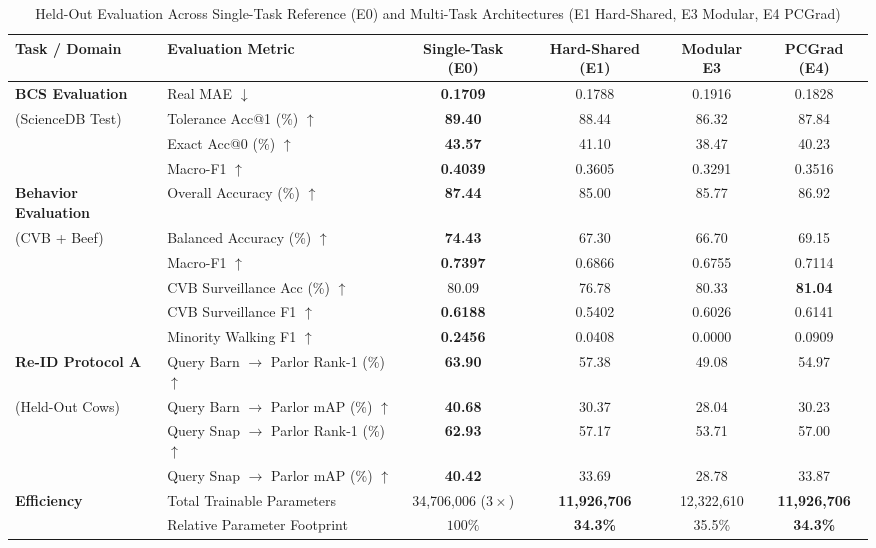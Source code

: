 \documentclass[conference]{IEEEtran}
\begin{document}
\begin{table}[t]
\caption{Held-Out Evaluation Across Single-Task Reference (E0) and Multi-Task Architectures (E1 Hard-Shared, E3 Modular, E4 PCGrad)}
\label{tab:mtl_results}
\centering
\small
\begin{tabularx}{\textwidth}{l X c c c c}
\toprule
\textbf{Task / Domain} & \textbf{Evaluation Metric} & \textbf{Single-Task (E0)} & \textbf{Hard-Shared (E1)} & \textbf{Modular E3} & \textbf{PCGrad (E4)} \\
\midrule
\textbf{BCS Evaluation} & Real MAE $\downarrow$ & \textbf{0.1709} & 0.1788 & 0.1916 & 0.1828 \\
(ScienceDB Test) & Tolerance Acc@1 (\%) $\uparrow$ & \textbf{89.40} & 88.44 & 86.32 & 87.84 \\
& Exact Acc@0 (\%) $\uparrow$ & \textbf{43.57} & 41.10 & 38.47 & 40.23 \\
& Macro-F1 $\uparrow$ & \textbf{0.4039} & 0.3605 & 0.3291 & 0.3516 \\
\midrule
\textbf{Behavior Evaluation} & Overall Accuracy (\%) $\uparrow$ & \textbf{87.44} & 85.00 & 85.77 & 86.92 \\
(CVB + Beef) & Balanced Accuracy (\%) $\uparrow$ & \textbf{74.43} & 67.30 & 66.70 & 69.15 \\
& Macro-F1 $\uparrow$ & \textbf{0.7397} & 0.6866 & 0.6755 & 0.7114 \\
& CVB Surveillance Acc (\%) $\uparrow$ & 80.09 & 76.78 & 80.33 & \textbf{81.04} \\
& CVB Surveillance F1 $\uparrow$ & \textbf{0.6188} & 0.5402 & 0.6026 & 0.6141 \\
& Minority Walking F1 $\uparrow$ & \textbf{0.2456} & 0.0408 & 0.0000 & 0.0909 \\
\midrule
\textbf{Re-ID Protocol A} & Query Barn $\to$ Parlor Rank-1 (\%) $\uparrow$ & \textbf{63.90} & 57.38 & 49.08 & 54.97 \\
(Held-Out Cows) & Query Barn $\to$ Parlor mAP (\%) $\uparrow$ & \textbf{40.68} & 30.37 & 28.04 & 30.23 \\
& Query Snap $\to$ Parlor Rank-1 (\%) $\uparrow$ & \textbf{62.93} & 57.17 & 53.71 & 57.00 \\
& Query Snap $\to$ Parlor mAP (\%) $\uparrow$ & \textbf{40.42} & 33.69 & 28.78 & 33.87 \\
\midrule
\textbf{Efficiency} & Total Trainable Parameters & 34,706,006 ($3\times$) & \textbf{11,926,706} & 12,322,610 & \textbf{11,926,706} \\
& Relative Parameter Footprint & $100\%$ & \textbf{34.3\%} & 35.5\% & \textbf{34.3\%} \\
\bottomrule
\end{tabularx}
\end{table}
\end{document}
